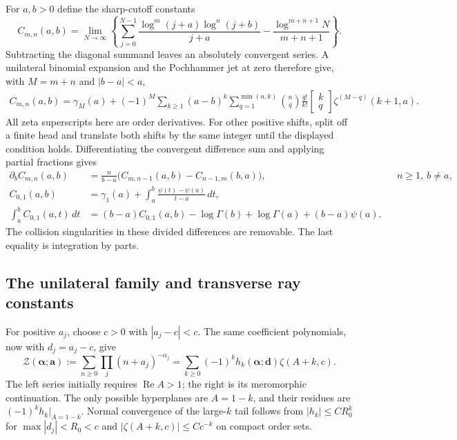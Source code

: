 For $a,b>0$ define the sharp-cutoff constants
\[
 C_{m,n}(a,b)=\lim_{N\to\infty}\left\{
   \sum_{j=0}^{N-1}\frac{\log^m(j+a)\log^n(j+b)}{j+a}
               -\frac{\log^{m+n+1}N}{m+n+1}\right\}.
\]
Subtracting the diagonal summand leaves an absolutely convergent
series. A unilateral binomial expansion and the Pochhammer jet at
zero therefore give, with $M=m+n$ and $|b-a|<a$,
\begin{align}
 C_{m,n}(a,b)=\gamma_M(a)+(-1)^M\sum_{k\ge1}(a-b)^k
   \sum_{q=1}^{\min(n,k)}\binom nq\frac{q!}{k!}
     \left[\begin{smallmatrix}k\\q\end{smallmatrix}\right]
                           \zeta^{(M-q)}(k+1,a).
 \label{utj:eq:cutoff}
\end{align}
All zeta superscripts here are order derivatives. For other positive
shifts, split off a finite head and translate both shifts by the same
integer until the displayed condition holds. Differentiating the
convergent difference sum and applying partial fractions gives
\begin{align}
 \partial_b C_{m,n}(a,b)
   &=\frac{n}{b-a}\bigl(C_{m,n-1}(a,b)-C_{n-1,m}(b,a)\bigr),
          &&n\ge1,\ b\ne a,\label{utj:eq:recursion}\\
 C_{0,1}(a,b)&=\gamma_1(a)+\int_a^b
                  \frac{\psi(t)-\psi(a)}{t-a}\,dt,\label{utj:eq:digamma}\\
 \int_a^b C_{0,1}(a,t)\,dt
   &=(b-a)C_{0,1}(a,b)-\log\Gamma(b)+\log\Gamma(a)
                               +(b-a)\psi(a).
 \label{utj:eq:primitive}
\end{align}
The collision singularities in these divided differences are
removable. The last equality is integration by parts.

\subsection{The unilateral family and transverse ray constants}
For positive $a_j$, choose $c>0$ with $|a_j-c|<c$. The same
coefficient polynomials, now with $d_j=a_j-c$, give
\begin{equation}
 \mathcal Z(\boldsymbol\alpha;\boldsymbol a)
 :=\sum_{n\ge0}\prod_j(n+a_j)^{-\alpha_j}
 =\sum_{k\ge0}(-1)^k h_k(\boldsymbol\alpha;\boldsymbol d)
                                      \zeta(A+k,c).
 \label{utj:eq:multizeta}
\end{equation}
The left series initially requires $\operatorname{Re}A>1$; the right
is its meromorphic continuation. The only possible hyperplanes are
$A=1-k$, and their residues are
$(-1)^k h_k|_{A=1-k}$. Normal convergence of the large-$k$ tail follows
from $|h_k|\le C R_0^k$ for $\max|d_j|<R_0<c$ and
$|\zeta(A+k,c)|\le Cc^{-k}$ on compact order sets.

